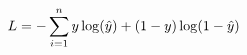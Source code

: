 \documentclass[preview]{standalone}
\begin{document}
\begin{align*}
\special{dvisvgm:raw <g id='unique000'>}L=-\sum^n_{i=1}y\log(\hat{y})+(1-y)\log(1-\hat{y})\special{dvisvgm:raw </g>}
\end{align*}
\end{document}
